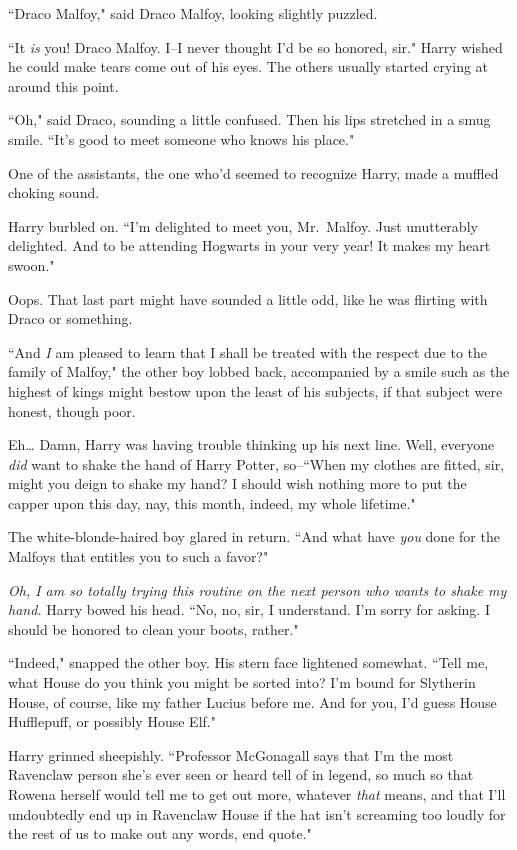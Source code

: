 ``Draco Malfoy," said Draco Malfoy, looking slightly puzzled.

``It \emph{is} you! Draco Malfoy. I\---I never thought I'd be so honored, sir." Harry wished he could make tears come out of his eyes. The others usually started crying at around this point.

``Oh," said Draco, sounding a little confused. Then his lips stretched in a smug smile. ``It's good to meet someone who knows his place."

One of the assistants, the one who'd seemed to recognize Harry, made a muffled choking sound.

Harry burbled on. ``I'm delighted to meet you, Mr.~Malfoy. Just unutterably delighted. And to be attending Hogwarts in your very year! It makes my heart swoon."

Oops. That last part might have sounded a little odd, like he was flirting with Draco or something.

``And \emph{I} am pleased to learn that I shall be treated with the respect due to the family of Malfoy," the other boy lobbed back, accompanied by a smile such as the highest of kings might bestow upon the least of his subjects, if that subject were honest, though poor.

Eh{\ldots} Damn, Harry was having trouble thinking up his next line. Well, everyone \emph{did} want to shake the hand of Harry Potter, so\---``When my clothes are fitted, sir, might you deign to shake my hand? I should wish nothing more to put the capper upon this day, nay, this month, indeed, my whole lifetime."

The white-blonde-haired boy glared in return. ``And what have \emph{you} done for the Malfoys that entitles you to such a favor?"

\emph{Oh, I am so totally trying this routine on the next person who wants to shake my hand.} Harry bowed his head. ``No, no, sir, I understand. I'm sorry for asking. I should be honored to clean your boots, rather."

``Indeed," snapped the other boy. His stern face lightened somewhat. ``Tell me, what House do you think you might be sorted into? I'm bound for Slytherin House, of course, like my father Lucius before me. And for you, I'd guess House Hufflepuff, or possibly House Elf."

Harry grinned sheepishly. ``Professor McGonagall says that I'm the most Ravenclaw person she's ever seen or heard tell of in legend, so much so that Rowena herself would tell me to get out more, whatever \emph{that} means, and that I'll undoubtedly end up in Ravenclaw House if the hat isn't screaming too loudly for the rest of us to make out any words, end quote."

